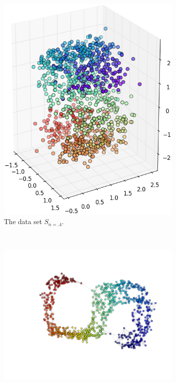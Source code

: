 \documentclass[12pt]{article}
\begin{document}
\begin{description}
	\begin{figure}[H]
		\centering
		\begin{subfigure}{.36\linewidth}
			\centering
			\includegraphics[width=\linewidth]{img/noise/s/5_0_20-original.png}
			\captionsetup{justification=centering}
			\caption{The data set $S_{n=.4}$.}
		\end{subfigure}~
		\begin{subfigure}{.6\linewidth}
			\centering
			\includegraphics[width=\linewidth]{img/noise/s/5_0_20-graph}

\end{subfigure}
\end{figure}
\end{description}
\end{document}
